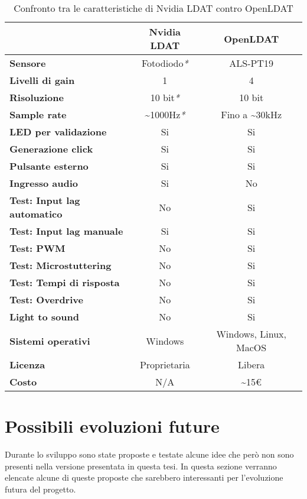 \begin{table}[h!]
	\centering
	\begin{tabular}{|l|c|c|} 
		\hline
		& \textbf{Nvidia LDAT} & \textbf{OpenLDAT}  \\ 
		\hline
		\textbf{Sensore} & Fotodiodo\textit{*} & ALS-PT19 \\
		\hline
		\textbf{Livelli di gain} & 1 & 4 \\
		\hline
		\textbf{Risoluzione} & 10 bit\textit{*} & 10 bit \\
		\hline
		\textbf{Sample rate} & \textasciitilde 1000Hz\textit{*} & Fino a \textasciitilde 30kHz \\
		\hline
		\textbf{LED per validazione} & Si & Si \\
		\hline
		\textbf{Generazione click} & Si & Si \\
		\hline
		\textbf{Pulsante esterno} & Si & Si \\
		\hline
		\textbf{Ingresso audio} & Si & No \\
		\hline
		\textbf{Test: Input lag automatico} & No & Si \\
		\hline
		\textbf{Test: Input lag manuale} & Si & Si \\
		\hline
		\textbf{Test: PWM} & No & Si \\
		\hline
		\textbf{Test: Microstuttering} & No & Si \\
		\hline
		\textbf{Test: Tempi di risposta} & No & Si \\
		\hline
		\textbf{Test: Overdrive} & No & Si \\
		\hline
		\textbf{Light to sound} & No & Si \\
		\hline
		\textbf{Sistemi operativi} & Windows & Windows, Linux, MacOS \\
		\hline
		\textbf{Licenza} & Proprietaria & Libera \\
		\hline
		\textbf{Costo} & N/A & \textasciitilde 15€ \\
		\hline
	\end{tabular}
	\caption{\label{tab:openldat_nvidialdat_comparison}Confronto tra le caratteristiche di Nvidia LDAT contro OpenLDAT}
\end{table}

\section{Possibili evoluzioni future}
Durante lo sviluppo sono state proposte e testate alcune idee che però non sono presenti nella versione presentata in questa tesi. In questa sezione verranno elencate alcune di queste proposte che sarebbero interessanti per l'evoluzione futura del progetto.

